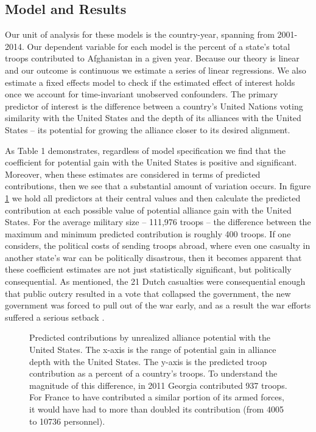 \documentclass[12pt,letterpaper]{article}
\begin{document}
	\subsection{Model and Results}
		Our unit of analysis for these models is the country-year, spanning from 2001-2014. Our dependent variable for each model is the percent of a state's total troops contributed to Afghanistan in a given year. Because our theory is linear and our outcome is continuous we estimate a series of linear regressions. We also estimate a fixed effects model to check if the estimated effect of interest holds once we account for time-invariant unobserved confounders. The primary predictor of interest is the difference between a country's United Nations voting similarity with the United States and the depth of its alliances with the United States -- its potential for growing the alliance closer to its desired alignment.

		\newpage
		
		\newpage

		As Table 1 demonstrates, regardless of model specification we find that the coefficient for potential gain with the United States is positive and significant. Moreover, when these estimates are considered in terms of predicted contributions, then we see that a substantial amount of variation occurs. In figure \ref{fig:predict} we hold all predictors at their central values and then calculate the predicted contribution at each possible value of potential alliance gain with the United States. For the average military size -- 111,976 troops -- the difference between the maximum and minimum predicted contribution is roughly 400 troops. If one considers, the political costs of sending troops abroad, where even one casualty in another state's war can be politically disastrous, then it becomes apparent that these coefficient estimates are not just statistically significant, but politically consequential. As mentioned, the 21 Dutch casualties were consequential enough that public outcry resulted in a vote that collapsed the government, the new government was forced to pull out of the war early, and as a result the war efforts suffered a serious setback \citep[95-100]{massie_whydemocraticallies_2016}.

		\newpage
		\begin{figure}[ht]
			\centering
			\resizebox{1.05\linewidth}{!}{
				
			}
			\caption{Predicted contributions by unrealized alliance potential with the United States. The x-axis is the range of potential gain in alliance depth with the United States. The y-axis is the predicted troop contribution as a percent of a country's troops. To understand the magnitude of this difference, in 2011 Georgia contributed 937 troops. For France to have contributed a similar portion of its armed forces, it would have had to more than doubled its contribution (from 4005 to 10736 personnel).}
			\label{fig:predict}
		\end{figure}
		\newpage
\end{document}
